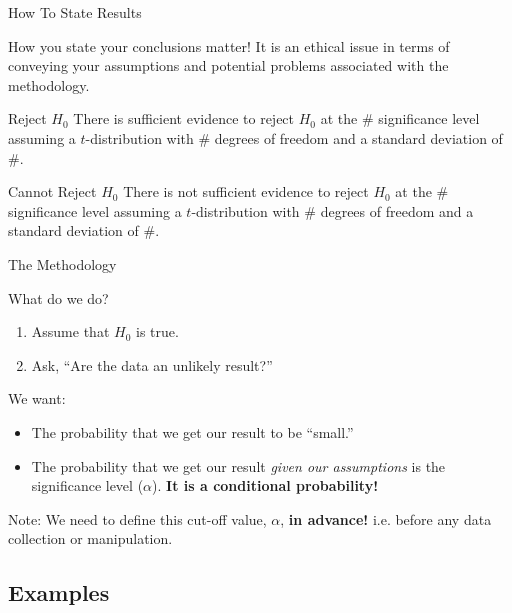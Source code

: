 \begin{frame}{How To State Results}

  How you state your conclusions matter! It is an ethical issue in
  terms of conveying your assumptions and potential problems
  associated with the methodology.

  \begin{block}{Reject $H_0$}
    There is sufficient evidence to reject $H_0$ at the \#
    significance level assuming a $t$-distribution with \# degrees of
    freedom and a standard deviation of \#.
  \end{block}

  \begin{block}{Cannot Reject $H_0$}
    There is not sufficient evidence to reject $H_0$ at the \#
    significance level assuming a $t$-distribution with \# degrees of
    freedom and a standard deviation of \#.
  \end{block}

  
\end{frame}

\begin{frame}{The Methodology}

  What do we do?

  \begin{enumerate}
  \item Assume that $H_0$ is true.
  \item Ask, ``Are the data an unlikely result?''
  \end{enumerate}

  {
    We want:
    \begin{itemize}
    \item The probability that we get our result to be ``small.''
    \item The probability that we get our result \textit{given our
        assumptions} is the significance level
      ($\alpha$). \textbf{\color{red} It is a conditional
        probability!}
    \end{itemize}
  }

  {
    Note: We need to define this cut-off value, $\alpha$, \textbf{in
      advance!} i.e. before any data collection or manipulation.
  }
  
\end{frame}


\subsection{Examples}

